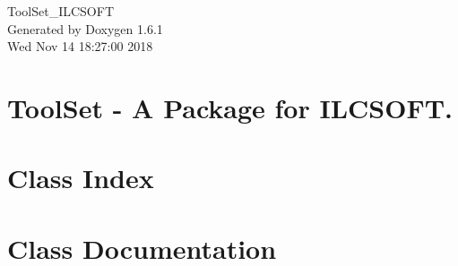 \documentclass[a4paper]{book}
\begin{document}
\hypersetup{pageanchor=false}
\begin{titlepage}
\vspace*{7cm}
\begin{center}
{\Large ToolSet\_\-ILCSOFT }\\
\vspace*{1cm}
{\large Generated by Doxygen 1.6.1}\\
\vspace*{0.5cm}
{\small Wed Nov 14 18:27:00 2018}\\
\end{center}
\end{titlepage}
\clearemptydoublepage
{}
\tableofcontents
\clearemptydoublepage
{}
\hypersetup{pageanchor=true}
\chapter{ToolSet -\/ A Package for ILCSOFT.}
\label{index}\hypertarget{index}{}
\chapter{Class Index}

\chapter{Class Documentation}







\printindex
\end{document}
